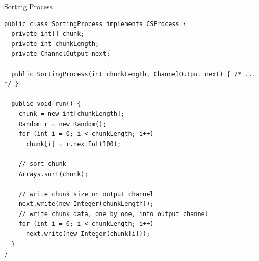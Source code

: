 \begin{frame}[fragile]{Sorting Process}
\begin{lstlisting}[basicstyle=\fontsize{7}{9}\selectfont\ttfamily]
public class SortingProcess implements CSProcess {
  private int[] chunk;
  private int chunkLength;
  private ChannelOutput next;

  public SortingProcess(int chunkLength, ChannelOutput next) { /* ... */ }

  public void run() {
    chunk = new int[chunkLength];
    Random r = new Random();
    for (int i = 0; i < chunkLength; i++)
      chunk[i] = r.nextInt(100);

    // sort chunk
    Arrays.sort(chunk);

    // write chunk size on output channel
    next.write(new Integer(chunkLength));
    // write chunk data, one by one, into output channel
    for (int i = 0; i < chunkLength; i++)
      next.write(new Integer(chunk[i]));
  }
}
\end{lstlisting}
\end{frame}

